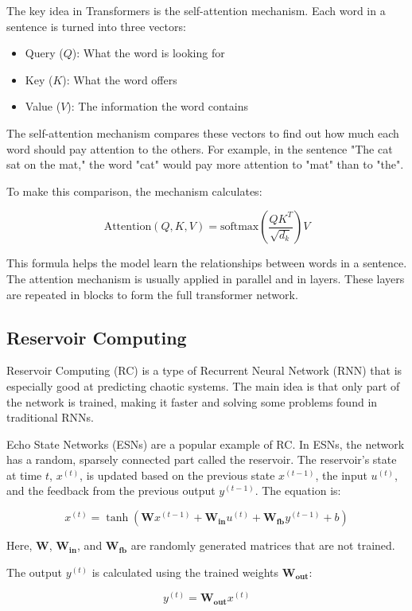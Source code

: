 \documentclass[11pt]{article}
\begin{document}
The key idea in Transformers is the self-attention mechanism. Each word in a sentence is turned into three vectors: 
\begin{itemize}
    \item Query ($Q$): What the word is looking for
    \item Key ($K$): What the word offers
    \item Value ($V$): The information the word contains
\end{itemize}

The self-attention mechanism compares these vectors to find out how much each word should pay attention to the others. For example, in the sentence "The cat sat on the mat," the word "cat" would pay more attention to "mat" than to "the".

To make this comparison, the mechanism calculates:

\[
\text{Attention}(Q, K, V) = \text{softmax}\left(\frac{QK^T}{\sqrt{d_k}}\right)V
\]

This formula helps the model learn the relationships between words in a sentence. The attention mechanism is usually applied in parallel and in layers. These layers are repeated in blocks to form the full transformer network. 

\subsection{Reservoir Computing}
Reservoir Computing (RC) is a type of Recurrent Neural Network (RNN) that is especially good at predicting chaotic systems. The main idea is that only part of the network is trained, making it faster and solving some problems found in traditional RNNs.

Echo State Networks (ESNs) are a popular example of RC. In ESNs, the network has a random, sparsely connected part called the reservoir. The reservoir's state at time $t$, $x^{(t)}$, is updated based on the previous state $x^{(t-1)}$, the input $u^{(t)}$, and the feedback from the previous output $y^{(t-1)}$. The equation is:

\[
x^{(t)} = \tanh(\mathbf{W}x^{(t-1)} + \mathbf{W_{in}}u^{(t)} + \mathbf{W_{fb}}y^{(t-1)} + b)
\]

Here, $\mathbf{W}$, $\mathbf{W_{in}}$, and $\mathbf{W_{fb}}$ are randomly generated matrices that are not trained.

The output $y^{(t)}$ is calculated using the trained weights $\mathbf{W_{out}}$:

\[
y^{(t)} = \mathbf{W_{out}}x^{(t)}
\]
\end{document}
